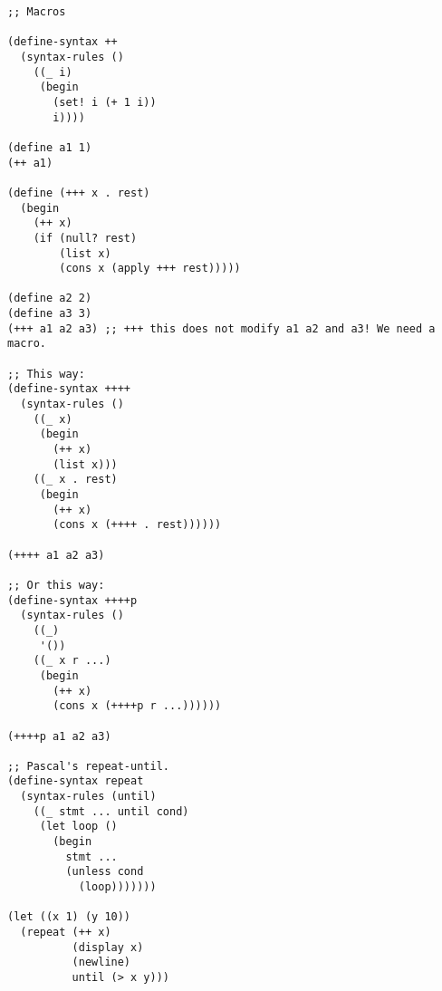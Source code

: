 \begin{lstlisting}
;; Macros

(define-syntax ++
  (syntax-rules ()
    ((_ i)
     (begin
       (set! i (+ 1 i))
       i))))

(define a1 1)
(++ a1)

(define (+++ x . rest)
  (begin
    (++ x)
    (if (null? rest)
        (list x)
        (cons x (apply +++ rest)))))

(define a2 2)
(define a3 3)
(+++ a1 a2 a3) ;; +++ this does not modify a1 a2 and a3! We need a macro.

;; This way:
(define-syntax ++++
  (syntax-rules ()
    ((_ x)
     (begin
       (++ x)
       (list x)))
    ((_ x . rest)
     (begin
       (++ x)
       (cons x (++++ . rest))))))

(++++ a1 a2 a3)

;; Or this way:
(define-syntax ++++p
  (syntax-rules ()
    ((_)
     '())
    ((_ x r ...)
     (begin
       (++ x)
       (cons x (++++p r ...))))))

(++++p a1 a2 a3)

;; Pascal's repeat-until.
(define-syntax repeat
  (syntax-rules (until)
    ((_ stmt ... until cond)
     (let loop ()
       (begin
         stmt ...
         (unless cond
           (loop)))))))

(let ((x 1) (y 10))
  (repeat (++ x)
          (display x)
          (newline)
          until (> x y)))
\end{lstlisting}
